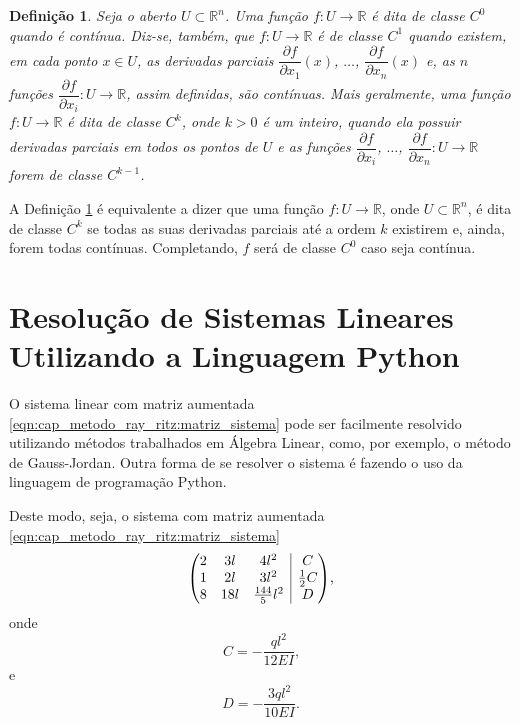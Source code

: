 \documentclass[
	12pt,				%
	openright,			%
    twoside,			%
	a4paper,			%
	english,			%
	french,				%
	spanish,			%
	brazil				%
	]{abntex2}
\makeatletter
\newenvironment{amatrix}[1]{%
  \left(\begin{array}{@{}*{#1}{c}|c@{}}
}{%
  \end{array}\right)
}
\newtheorem{definicao}{Definição}
\numberwithin{lema}{chapter}
\numberwithin{teorema}{chapter}
\numberwithin{definicao}{chapter}
\numberwithin{exemplo}{chapter}
\numberwithin{figure}{chapter}
\makeatother
\begin{document}
\begin{apendicesenv}
{	\begin{definicao}
		\label{def:cap_conceitos_analise:classe_ck}
		Seja o aberto $U\subset\mathbb{R}^n$. Uma função $f:U\longrightarrow\mathbb{R}$ é dita de classe $C^0$ quando é contínua. Diz-se, também, que $f:U\longrightarrow\mathbb{R}$ é de classe $C^1$ quando existem, em cada ponto $x\in U$, as derivadas parciais $\dfrac{\partial f}{\partial x_1}(x)$, $\dots$, $\dfrac{\partial f}{\partial x_n}(x)$ e, as $n$ funções $\dfrac{\partial f}{\partial x_i}:U\longrightarrow \mathbb{R}$, assim definidas, são contínuas. Mais geralmente, uma função $f:U\longrightarrow\mathbb{R}$ é dita de classe $C^k$, onde $k>0$ é um inteiro, quando ela possuir derivadas parciais em todos os pontos de $U$ e as funções $\dfrac{\partial f}{\partial x_i}$, $\dots$, $\dfrac{\partial f}{\partial x_n}:U\longrightarrow \mathbb{R}$ forem de classe $C^{k-1}$.
	\end{definicao}
	
	A Definição \ref{def:cap_conceitos_analise:classe_ck} é equivalente a dizer que uma função $f:U\longrightarrow\mathbb{R}$, onde $U\subset\mathbb{R}^n$, é dita de classe $C^k$ se todas as suas derivadas parciais até a ordem $k$ existirem e, ainda, forem todas contínuas. Completando, $f$ será de classe $C^0$ caso seja contínua.
}

\chapter{Resolução de Sistemas Lineares Utilizando a Linguagem Python}
\label{apend:res_sis_lin}
{
	O sistema linear com matriz aumentada \eqref{eqn:cap_metodo_ray_ritz:matriz_sistema} pode ser facilmente resolvido utilizando métodos trabalhados em Álgebra Linear, como, por exemplo, o método de Gauss-Jordan. Outra forma de se resolver o sistema é fazendo o uso da linguagem de programação Python.
	
	Deste modo, seja, o sistema com matriz aumentada \eqref{eqn:cap_metodo_ray_ritz:matriz_sistema}
	\begin{equation}
		\label{eqn:cap_ap_sis_lin:matriz_sistema}
		\begin{amatrix}{3}
			2 & 3l  & 4l^2 				 & C \\
			1 & 2l  & 3l^2				 & \frac{1}{2}C \\
			8 & 18l & \frac{144}{5} l^2 & D
		\end{amatrix}
		\text{,}
	\end{equation}
	onde 
	\begin{equation}
		\label{eqn:cap_ap_sis_lin:aux_var_C}
		C=-\frac{ql^2}{12EI}
		\text{,}
	\end{equation}
	e
	\begin{equation}
		\label{eqn:cap_ap_sis_lin:aux_var_D}
		D=-\frac{3ql^2}{10EI}
		\text{.}
	\end{equation}
	
}
\end{apendicesenv}
\end{document}
